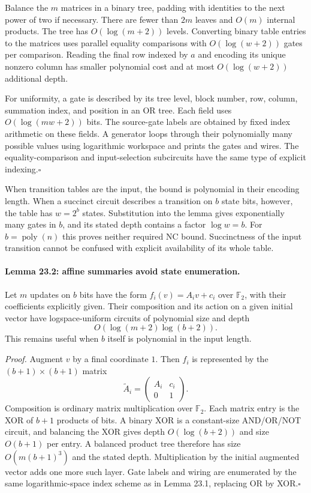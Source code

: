 \documentclass[11pt]{article}
\begin{document}
Balance the $m$ matrices in a binary tree, padding with identities to the
next power of two if necessary. There are fewer than $2m$ leaves and
$O(m)$ internal products. The tree has $O(\log(m+2))$ levels. Converting
binary table entries to the matrices uses parallel equality comparisons
with $O(\log(w+2))$ gates per comparison. Reading the final row indexed by
$a$ and encoding its unique nonzero column has smaller polynomial cost
and at most $O(\log(w+2))$ additional depth.

For uniformity, a gate is described by its tree level, block number,
row, column, summation index, and position in an OR tree. Each field uses
$O(\log(mw+2))$ bits. The source-gate labels are obtained by fixed index
arithmetic on these fields. A generator loops through their polynomially
many possible values using logarithmic workspace and prints the gates and
wires. The equality-comparison and input-selection subcircuits have the
same type of explicit indexing.\hfill$\square$

When transition tables are the input, the bound is polynomial in their
encoding length. When a succinct circuit describes a transition on $b$
state bits, however, the table has $w=2^b$ states. Substitution into the
lemma gives exponentially many gates in $b$, and its stated depth contains
a factor $\log w=b$. For $b=\operatorname{poly}(n)$ this proves neither
required NC bound. Succinctness of the input transition cannot be confused
with explicit availability of its whole table.

\paragraph{Lemma 23.2: affine summaries avoid state enumeration.}
Let $m$ updates on $b$ bits have the form
$f_i(v)=A_i v+c_i$ over $\mathbb F_2$, with their coefficients explicitly
given. Their composition and its action on a given initial vector have
logspace-uniform circuits of polynomial size and depth
\[
                     O(\log(m+2)\log(b+2)).
\]
This remains useful when $b$ itself is polynomial in the input length.

\emph{Proof.} Augment $v$ by a final coordinate $1$. Then $f_i$ is represented
by the $(b+1)\times(b+1)$ matrix
\[
                   \widetilde A_i=
                   \begin{pmatrix}A_i&c_i\\0&1\end{pmatrix}.
\]
Composition is ordinary matrix multiplication over $\mathbb F_2$. Each
matrix entry is the XOR of $b+1$ products of bits. A binary XOR is a
constant-size AND/OR/NOT circuit, and balancing the XOR gives depth
$O(\log(b+2))$ and size $O(b+1)$ per entry. A balanced product tree
therefore has size $O(m(b+1)^3)$ and the stated depth. Multiplication by
the initial augmented vector adds one more such layer. Gate labels and
wiring are enumerated by the same logarithmic-space index scheme as in
Lemma 23.1, replacing OR by XOR.\hfill$\square$
\end{document}
